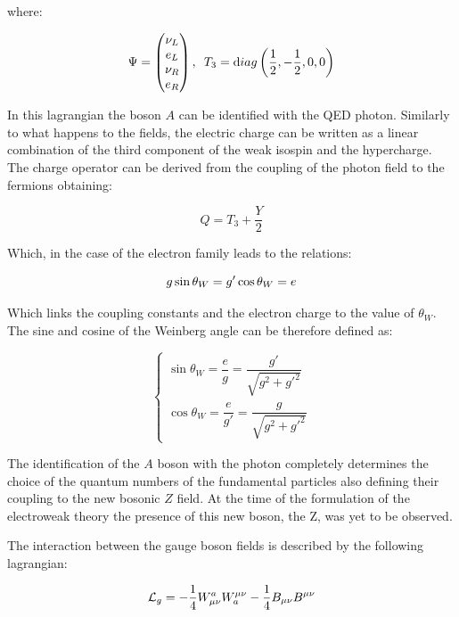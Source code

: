 where:

\begin{equation}
\Psi = \begin{pmatrix}
\nu_L\\ 
e_L\\ 
\nu_R\\ 
e_R
\end{pmatrix}, \, \, \, T_3 = {\rm diag}\left(\frac{1}{2},-\frac{1}{2},0,0\right)
\end{equation}

In this lagrangian the boson $A$ can be identified with the QED photon. Similarly to what happens to the fields, the electric charge can be written as a linear combination of the third component of the weak isospin and the hypercharge. The charge operator can be derived from the coupling of the photon field to the fermions obtaining: 

\begin{equation}
Q = T_3 + \dfrac{Y}{2}
\end{equation}

Which, in the case of the electron family leads to the relations:

\begin{equation}
g \opname{sin}\theta_W = g' \opname{cos}\theta_W = e
\end{equation}

Which links the coupling constants and the electron charge to the value of $\theta_W$. The sine and cosine of the Weinberg angle can be therefore defined as:

\begin{equation}
\left\{\begin{matrix}
\operatorname{sin}\theta_W = \dfrac{e}{g} = \dfrac{g'}{\sqrt{g^2+g'^2}}\\ 
\operatorname{cos}\theta_W = \dfrac{e}{g'} = \dfrac{g}{\sqrt{g^2+g'^2}}
\end{matrix}\right.
\label{eq:win_angle}
\end{equation}

The identification of the $A$ boson with the photon completely determines the choice of the quantum numbers of the fundamental particles also defining their coupling to the new bosonic $Z$ field. At the time of the formulation of the electroweak theory the presence of this new boson, the Z, was yet to be observed.

The interaction between the gauge boson fields is described by the following lagrangian:

\begin{equation}
\l_g = -\dfrac{1}{4}W^a_{\mu\nu}W_a^{\mu\nu} -\dfrac{1}{4}B_{\mu\nu}B^{\mu\nu}
\label{eq:weak_free}
\end{equation}

